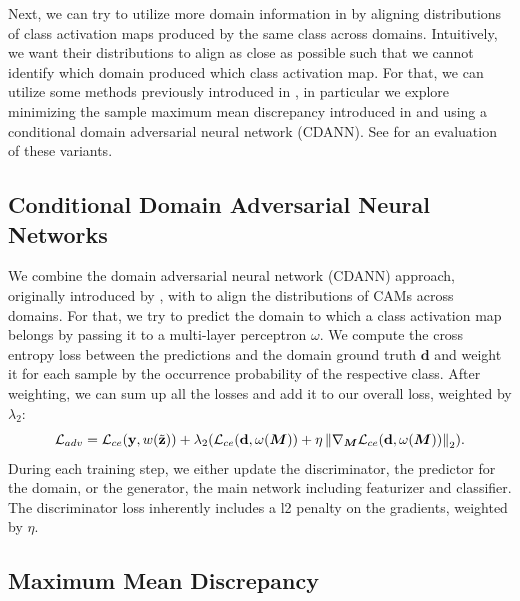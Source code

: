 Next, we can try to utilize more domain information in \divcam by aligning distributions of class activation maps produced by the same class across domains. Intuitively, we want their distributions to align as close as possible such that we cannot identify which domain produced which class activation map. For that, we can utilize some methods previously introduced in , in particular we explore minimizing the sample maximum mean discrepancy introduced in  and using a conditional domain adversarial neural network (CDANN). See  for an evaluation of these variants.

\subsection{Conditional Domain Adversarial Neural Networks}
We combine the domain adversarial neural network (CDANN) approach, originally introduced by \citet{LiGTLT18}, with \divcam to align the distributions of CAMs across domains. For that, we try to predict the domain to which a class activation map belongs by passing it to a multi-layer perceptron $\omega$. We compute the cross entropy loss between the predictions and the domain ground truth $\mathbf{d}$ and weight it for each sample by the occurrence probability of the respective class.
After weighting, we can sum up all the losses and add it to our overall loss, weighted by $\lambda_2$:
\begin{equation}
\label{eq:adv}
\mathcal{L}_{adv} =\mathcal{L}_{ce}(\mathbf{y}, w(\Tilde{\mathbf{z}}))+\lambda_2 ( \mathcal{L}_{ce}(\mathbf{d}, \omega(\boldsymbol{M})) + \eta \left\|\nabla_{\boldsymbol{M}} \mathcal{L}_{ce}(\mathbf{d}, \omega(\boldsymbol{M}))\right\|_2).
\end{equation}
During each training step, we either update the discriminator, \ie the predictor for the domain, or the generator, \ie the main network including featurizer and classifier. The discriminator loss inherently includes a l2 penalty on the gradients, weighted by $\eta$.


\subsection{Maximum Mean Discrepancy}


